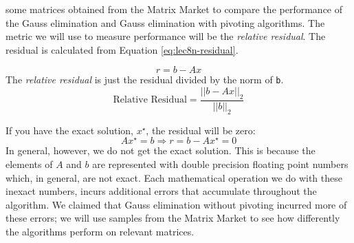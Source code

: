  some matrices obtained from the Matrix Market to compare the performance of the Gauss elimination and Gauss elimination with pivoting algorithms.  The metric we will use to measure performance will be the \emph{relative residual}.  The residual is calculated from Equation \ref{eq:lec8n-residual}.

\begin{equation}
r = b - Ax
\label{eq:lec8n-residual}
\end{equation}
The \emph{relative residual} is just the residual divided by the norm of \lstinline[style=myMatlab]{b}.
\begin{equation}
\text{Relative Residual} = \frac{||b - Ax||_{2}}{||b||_2}
\end{equation}

If you have the exact solution, $x^{\star}$, the residual will be zero:
\begin{equation*}
Ax^{\star} = b \Rightarrow r = b - Ax^{\star} = 0
\end{equation*}
In general, however, we do not get the exact solution.  This is because the elements of $A$ and $b$ are represented with double precision floating point numbers which, in general, are not exact.  Each mathematical operation we do with these inexact numbers, incurs additional errors that accumulate throughout the algorithm.  We claimed that Gauss elimination without pivoting incurred more of these errors; we will use samples from the Matrix Market to see how differently the algorithms perform on relevant matrices.

